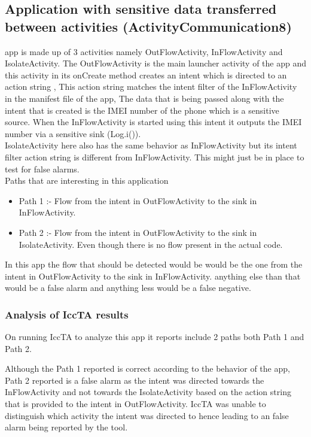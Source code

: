 \documentclass[journal]{IEEEtran}
\begin{document}
\subsection{Application with sensitive data transferred between activities (ActivityCommunication8)}
 app is made up of 3 activities namely OutFlowActivity, InFlowActivity and IsolateActivity. The OutFlowActivity is the main launcher activity of the app and this activity in its onCreate method creates an intent which is directed to an action string , This action string matches the intent filter of the InFlowActivity in the manifest file of the app, The data that is being passed along with the intent that is created is the IMEI number of the phone which is  a sensitive source. When the InFlowActivity is started using this intent it outputs the IMEI  number via a sensitive sink (Log.i()).\\
IsolateActivity here also has the same behavior as InFlowActivity but its intent filter action string is different from InFlowActivity. This might just be in place to test for false alarms.\\
Paths that are interesting in this application
\begin{itemize}
	\item Path 1 :-  Flow from the intent in OutFlowActivity to  the sink in InFlowActivity.
	\item Path 2 :-  Flow from the intent in OutFlowActivity to  the sink in IsolateActivity. Even though there is no flow present in the actual code.
\end{itemize}
In this app the flow that should be detected would be would be the one from the intent in OutFlowActivity to the sink in InFlowActivity. anything else than that would be a false alarm and anything less would be a false negative. 

  

\subsubsection{Analysis of IccTA results}
On running IccTA to analyze this app it reports include 2 paths both Path 1 and Path 2.

Although the Path 1 reported is correct according to the behavior of the app, Path 2 reported is a false alarm as the intent was directed towards the InFlowActivity and not towards the IsolateActivity based on the action string that is provided to the intent in OutFlowActivity. IccTA was unable to distinguish   which activity the intent was directed to hence leading to an false alarm being reported by the tool.
\end{document}
